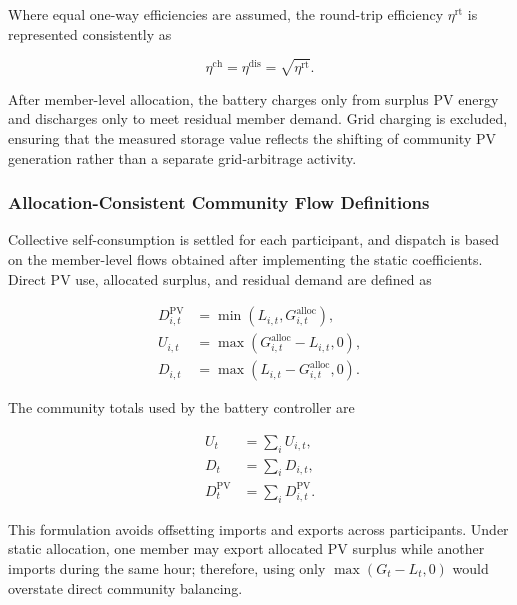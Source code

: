 Where equal one-way efficiencies are assumed, the round-trip efficiency $\eta^{\mathrm{rt}}$ is represented consistently as

\begin{equation}
\label{eq:one_way_efficiency}
\eta^{\mathrm{ch}}=\eta^{\mathrm{dis}}=\sqrt{\eta^{\mathrm{rt}}}.
\end{equation}

After member-level allocation, the battery charges only from surplus PV energy and discharges only to meet residual member demand. Grid charging is excluded, ensuring that the measured storage value reflects the shifting of community PV generation rather than a separate grid-arbitrage activity.

\subsubsection{Allocation-Consistent Community Flow Definitions}
\label{subsec:allocation_consistent_flows}

Collective self-consumption is settled for each participant, and dispatch is based on the member-level flows obtained after implementing the static coefficients. Direct PV use, allocated surplus, and residual demand are defined as

\begin{align}
D^{\mathrm{PV}}_{i,t} &= \min\!\left(L_{i,t},G^{\mathrm{alloc}}_{i,t}\right),\label{eq:direct_pv_member_bess}\\
U_{i,t} &= \max\!\left(G^{\mathrm{alloc}}_{i,t}-L_{i,t},0\right),\label{eq:surplus_pv_member}\\
D_{i,t} &= \max\!\left(L_{i,t}-G^{\mathrm{alloc}}_{i,t},0\right).\label{eq:deficit_pv_member}
\end{align}

The community totals used by the battery controller are

\begin{align}
U_t &= \sum_i U_{i,t},\label{eq:allocated_surplus_total}\\
D_t &= \sum_i D_{i,t},\label{eq:allocated_deficit_total}\\
D^{\mathrm{PV}}_t &= \sum_i D^{\mathrm{PV}}_{i,t}.\label{eq:direct_pv_total}
\end{align}

This formulation avoids offsetting imports and exports across participants. Under static allocation, one member may export allocated PV surplus while another imports during the same hour; therefore, using only $\max(G_t-L_t,0)$ would overstate direct community balancing.

